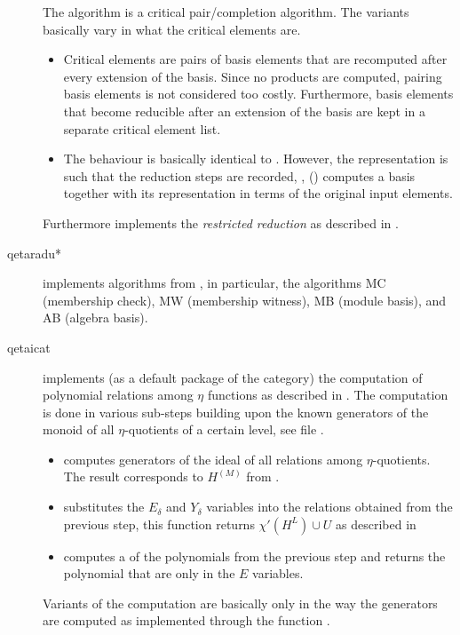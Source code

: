\documentclass{article}
\begin{document}
\begin{description}
  The algorithm \algoSamba{} is a critical pair/completion algorithm.
  The variants basically vary in what the critical elements are.
  \begin{itemize}
  \item {} Critical elements are pairs of basis
    elements that are recomputed after every extension of the basis.
    Since no products are computed, pairing basis elements is not
    considered too costly. Furthermore, basis elements that become
    reducible after an extension of the basis are kept in a separate
    critical element list.
  \item {} The behaviour is basically identical
    to . However, the representation is such
    that the reduction steps are recorded, \ie,
     (\algoSamba) computes a basis together with
    its representation in terms of the original input elements.
  \end{itemize}
  Furthermore  implements the \emph{restricted
    reduction} as described in
  \cite{Hemmecke:DancingSambaRamanujan:2018}.

\item[qetaradu*] implements algorithms from
  \cite{Radu:RamanujanKolberg:2015}, in particular, the algorithms MC
  (membership check), MW (membership witness), MB (module basis), and
  AB (algebra basis).

\item[qetaicat] implements (as a default package of the category) the
  computation of polynomial relations among $\eta$ functions as
  described in \cite{Hemmecke+Radu:EtaRelations:2018}. The computation
  is done in various sub-steps building upon the known generators of
  the monoid of all $\eta$-quotients of a certain level, see file
  .
  \begin{itemize}
  \item {} computes generators of the
    ideal of all relations among $\eta$-quotients. The result
    corresponds to $H^{(M)}$ from
    \cite[Chapter~7]{Hemmecke+Radu:EtaRelations:2018}.
  \item {} substitutes the $E_\delta$
    and $Y_\delta$ variables into the relations obtained from the
    previous step, this function returns $\chi'(H^L)\cup U$ as
    described in \cite[Chapter~7]{Hemmecke+Radu:EtaRelations:2018}
  \item {} computes a \GB{} of the polynomials from
    the previous step and returns the polynomial that are only in the
    $E$ variables.
  \end{itemize}
  Variants of the computation are basically only in the way the
  generators are computed as implemented through the function
  .


\end{description}
\end{document}
